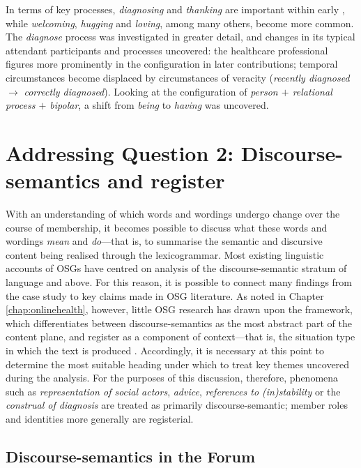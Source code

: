 In terms of key processes, \emph{diagnosing} and \emph{thanking} are important within early , while \emph{welcoming}, \emph{hugging} and \emph{loving}, among many others, become more common. The \emph{diagnose} process was investigated in greater detail, and changes in its typical attendant participants and processes uncovered: the healthcare professional figures more prominently in the configuration in later contributions; temporal circumstances become displaced by circumstances of veracity (\emph{recently diagnosed} $\rightarrow$ \emph{correctly diagnosed}). Looking at the configuration of \emph{person $+$ relational process $+$ bipolar}, a shift from \emph{being} to \emph{having} was uncovered. 

\section{Addressing Question 2: Discourse-semantics and register}

With an understanding of which words and wordings undergo change over the course of membership, it becomes possible to discuss what these words and wordings \emph{mean} and \emph{do}---that is, to summarise the semantic and discursive content being realised through the \gls{lexicogrammar}. Most existing linguistic accounts of \glspl{OSG} have centred on analysis of the \gls{discourse-semantic} stratum of language and above. For this reason, it is possible to connect many findings from the case study to key claims made in \gls{OSG} literature. As noted in Chapter \ref{chap:onlinehealth}, however, little \gls{OSG} research has drawn upon the  framework, which differentiates between \glspl{discourse-semantic} as the most abstract part of the content plane, and register as a component of context---that is, the situation type in which the text is produced \cite{halliday_language_1989}. Accordingly, it is necessary at this point to determine the most suitable heading under which to treat key \glspl{theme} uncovered during the analysis. For the purposes of this discussion, therefore, phenomena such as \emph{representation of social actors}, \emph{advice}, \emph{references to (in)stability} or the \emph{construal of diagnosis} are treated as primarily \gls{discourse-semantic}; member roles and identities more generally are registerial.

\subsection{Discourse-semantics in the Forum}


